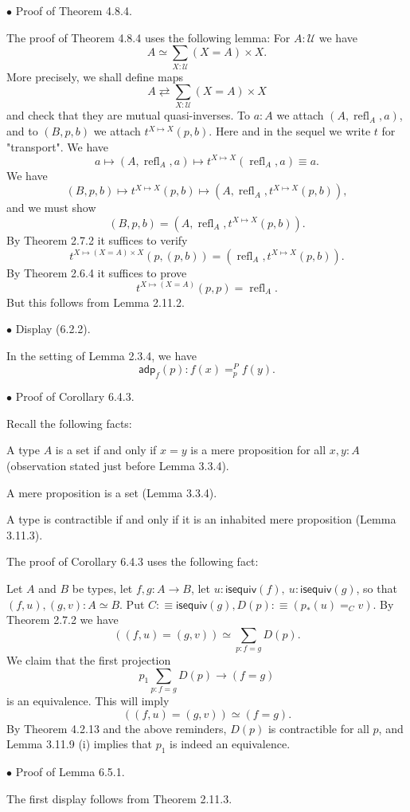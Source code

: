 \documentclass[12pt]{article}
\newcommand{\msf}{\mathsf}
\newcommand{\nn}{\noindent}
\newcommand{\oo}{\operatorname}
\newcommand{\U}{\mathcal U}
\begin{document}

\nn$\bullet$ Proof of Theorem 4.8.4.

The proof of Theorem 4.8.4 uses the following lemma: For $A:\U$ we have 
$$
A\simeq\sum_{X:\U}(X=A)\times X.
$$
More precisely, we shall define maps 
$$
A\rightleftarrows\sum_{X:\U}(X=A)\times X
$$ 
and check that they are mutual quasi-inverses. To $a:A$ we attach $(A,\oo{refl}_A,a)$, and to $(B,p,b)$ we attach $t^{X\mapsto X}(p,b)$. Here and in the sequel we write $t$ for "transport". We have 
$$
a\mapsto(A,\oo{refl}_A,a)\mapsto t^{X\mapsto X}(\oo{refl}_A,a)\equiv a.
$$ 
We have 
$$
(B,p,b)\mapsto t^{X\mapsto X}(p,b)\mapsto(A,\oo{refl}_A,t^{X\mapsto X}(p,b)),
$$ 
and we must show 
$$
(B,p,b)=(A,\oo{refl}_A,t^{X\mapsto X}(p,b)).
$$ 
By Theorem 2.7.2 it suffices to verify 
$$
t^{X\mapsto (X=A)\times X}(p,(p,b))=(\oo{refl}_A,t^{X\mapsto X}(p,b)).
$$ 
By Theorem 2.6.4 it suffices to prove 
$$
t^{X\mapsto (X=A)}(p,p)=\oo{refl}_A.
$$ 
But this follows from Lemma 2.11.2.


\nn$\bullet$ Display (6.2.2).

In the setting of Lemma 2.3.4, we have 
$$
\msf{adp}_f(p):f(x)=^P_pf(y).
$$


\nn$\bullet$ Proof of Corollary 6.4.3. 

Recall the following facts: 

A type $A$ is a set if and only if $x=y$ is a mere proposition for all $x,y:A$ (observation stated just before Lemma 3.3.4). 

A mere proposition is a set (Lemma 3.3.4).

A type is contractible if and only if it is an inhabited mere proposition (Lemma 3.11.3). 

The proof of Corollary 6.4.3 uses the following fact:

Let $A$ and $B$ be types, let $f,g:A\to B$, let $u:\mathsf{isequiv}(f),\ u:\mathsf{isequiv}(g)$, so that $(f,u),(g,v):A\simeq B$. Put $C:\equiv\mathsf{isequiv}(g), D(p):\equiv(p_*(u)=_Cv)$. By Theorem 2.7.2 we have 
$$
((f,u)=(g,v))\simeq\sum_{p:f=g}D(p).
$$ 
We claim that the first projection 
$$
p_1\sum_{p:f=g}D(p)\to(f=g)
$$ 
is an equivalence. This will imply 
$$
((f,u)=(g,v))\simeq(f=g).
$$ 
By Theorem 4.2.13 and the above reminders, $D(p)$ is contractible for all $p$, and Lemma 3.11.9 (i) implies that $p_1$ is indeed an equivalence.


\nn$\bullet$ Proof of Lemma 6.5.1.

The first display follows from Theorem 2.11.3.
\end{document}
